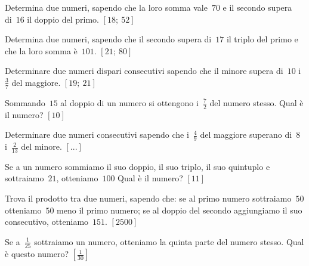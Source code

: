 \begin{htmulticols}{2}
\begin{esercizio}[*]
\label{ese:14.1}
Determina due numeri, sapendo che la loro somma vale~\(70\) e il secondo supera 
di~\(16\) il doppio del primo. \hfill \(\left[18;~52\right]\)
\end{esercizio}

\begin{esercizio}[*]
\label{ese:14.2}
Determina due numeri, sapendo che il secondo supera di~\(17\) il triplo del primo 
e che la loro somma è~\(101\). \hfill \(\left[21;~80\right]\)
\end{esercizio}

\begin{esercizio}[*]
\label{ese:14.3}
Determinare due numeri dispari consecutivi sapendo che il minore supera di~\(10\) 
i~\(\frac{3}{7}\) del maggiore. \hfill \(\left[19;~21\right]\)
\end{esercizio}

\begin{esercizio}[*]
\label{ese:14.4}
Sommando~\(15\) al doppio di un numero si ottengono i~\(\frac{7}{2}\) del numero 
stesso. Qual è il numero? \hfill \(\left[10\right]\)
\end{esercizio}

\begin{esercizio}
\label{ese:14.5}
Determinare due numeri consecutivi sapendo che i~\(\frac{4}{9}\) del maggiore 
superano di~\(8\) i~\(\frac{2}{13}\) del minore. \hfill \(\left[...\right]\)
\end{esercizio}

\begin{esercizio}[*]
\label{ese:14.6}
Se a un numero sommiamo il suo doppio, il suo triplo, il suo quintuplo e 
sottraiamo~\(21\), otteniamo~\(100\) Qual è il numero? \hfill 
\(\left[11\right]\)
\end{esercizio}

\begin{esercizio}[*]
\label{ese:14.7}
Trova il prodotto tra due numeri, sapendo che: se al primo numero 
sottraiamo~\(50\) otteniamo~\(50\) meno il primo numero; se al doppio del 
secondo 
aggiungiamo il suo consecutivo, otteniamo~\(151\). \hfill \(\left[2500\right]\)
\end{esercizio}

\begin{esercizio}[*]
\label{ese:14.8}
Se a~\(\frac{1}{25}\) sottraiamo un numero, otteniamo la quinta parte del 
numero 
stesso. Qual è questo numero? \hfill \(\left[\frac{1}{30}\right]\)
\end{esercizio}


\end{htmulticols}
